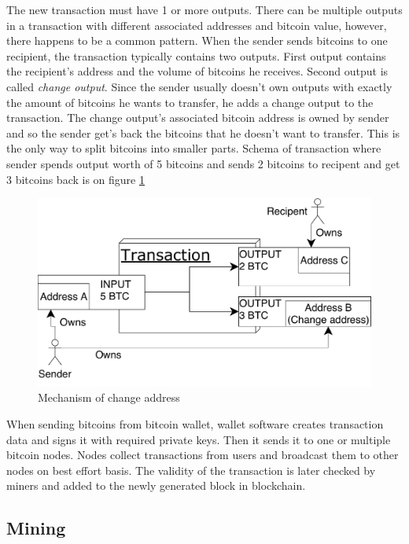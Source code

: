 \documentclass[
  digital, %
  table,   %
  lof,     %
  lot,     %
  oneside
]{fithesis3}
\begin{document}
The new transaction must have 1 or more outputs.
There can be multiple outputs in a transaction with different associated addresses and bitcoin value,
however, there happens to be a common pattern. When the sender sends bitcoins to one recipient,
the transaction typically contains two outputs.
First output contains the recipient's address and the volume of bitcoins he receives.
Second output is called \emph{change output}.
Since the sender usually doesn't own outputs with exactly the amount of bitcoins
he wants to transfer, he adds a change output to the transaction.
The change output's associated bitcoin address is owned by sender
and so the sender get's back the bitcoins that he doesn't want to transfer.
This is the only way to split bitcoins into smaller parts. 
Schema of transaction where sender spends output worth of 5 bitcoins
and sends 2 bitcoins to recipent and get 3 bitcoins back is on figure \ref{change} 
 
\begin{figure}[!htb]
    \centering
    \includegraphics[width=1\textwidth]{change}
    \caption{Mechanism of change address}
    \label{change}
\end{figure}
 
When sending bitcoins from bitcoin wallet,
 wallet software creates transaction data and signs it with required private keys.
 Then it sends it to one or multiple bitcoin nodes.
Nodes collect transactions from users and broadcast them to other nodes on best effort basis.
The validity of the transaction is later checked by miners and added to the newly generated block
in blockchain.

\subsection{Mining}
\end{document}
